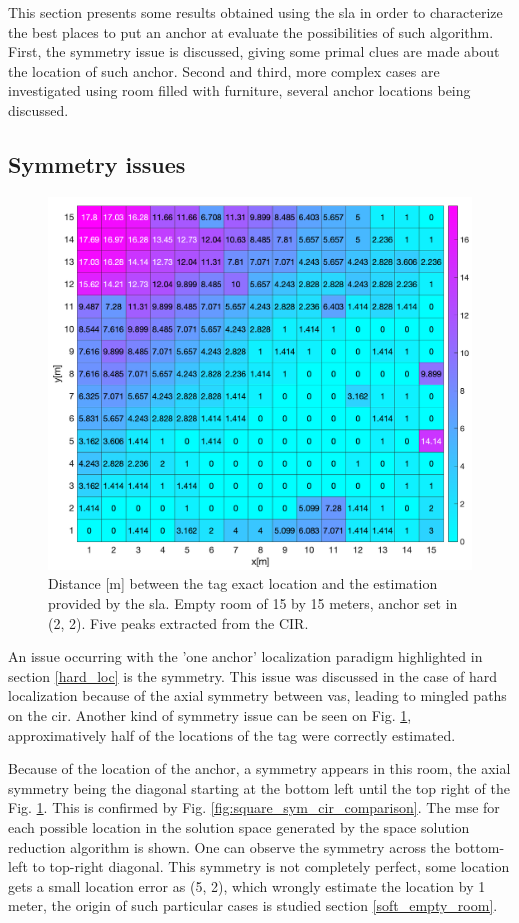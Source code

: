 This section presents some results obtained using the \gls{sla} in order to characterize the best places to put an anchor at evaluate the possibilities of such algorithm. First, the symmetry issue is discussed, giving some primal clues are made about the location of such anchor. Second and third, more complex cases are investigated using room filled with furniture, several anchor locations being discussed.

\subsection{Symmetry issues}
\label{sym_cases}
\begin{figure}[H]
\centering
\includegraphics[width=.73\linewidth]{Images/15_15_sym.png}
\caption{Distance [m] between the tag exact location and the estimation provided by the \gls{sla}. Empty room of 15 by 15 meters, anchor set in (2, 2). Five peaks extracted from the CIR. \label{fig:square_sym}}
\end{figure}

An issue occurring with the 'one anchor' localization paradigm highlighted in section \ref{hard_loc} is the symmetry. This issue was discussed in the case of hard localization because of the axial symmetry between \glspl{va}, leading to mingled paths on the \gls{cir}. Another kind of symmetry issue can be seen on Fig. \ref{fig:square_sym}, approximatively half of the locations of the tag were correctly estimated.
\vspace{2mm}

Because of the location of the anchor, a symmetry appears in this room, the axial symmetry being the diagonal starting at the bottom left until the top right of the Fig. \ref{fig:square_sym}. This is confirmed by Fig. \ref{fig:square_sym_cir_comparison}. The \gls{mse} for each possible location in the solution space generated by the space solution reduction algorithm is shown. One can observe the symmetry across the bottom-left to top-right diagonal. This symmetry is not completely perfect, some location gets a small location error as (5, 2), which wrongly estimate the location by 1 meter, the origin of such particular cases is studied section \ref{soft_empty_room}.

